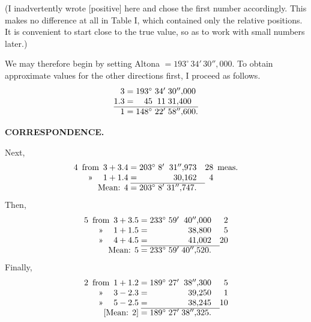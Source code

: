 (I inadvertently wrote [positive] here and chose the first number accordingly. This makes no difference at all in Table I, which contained only the relative positions. It is convenient to start close to the true value, so as to work with small numbers later.)

We may therefore begin by setting Altona \(=193^\circ\,34'\,30''{,}000\). To obtain approximate values for the other directions first, I proceed as follows.
\[
\begin{array}{@{}r@{\;=\;}r@{\;}r@{\;}l@{}}
 3&193^\circ&34'&30''{,}000\\
 1.3&45&11&31{,}400\\
 \hline
 1&148^\circ&22'&58''{,}600.
\end{array}
\]
\par\noindent\makebox[.86\linewidth][r]{36\textsuperscript{*}}\par

\par\clearpage
\noindent{}\hfill{\small\textbf{CORRESPONDENCE.}}\hfill\null\par\medskip

Next,
\[
\begin{array}{@{}r@{\enspace}c@{\enspace}r@{\;}c@{\;}r@{\;}r@{\;}r@{\quad}r@{\enspace}l@{}}
 4&\text{from}&3+3.4&=&203^\circ&8'&31''{,}973&28&\text{meas.}\\
 &\text{»}&1+1.4&=& &&30{,}162&4&\\
 \cline{4-7}
 \multicolumn{3}{r@{\;}}{\text{Mean: }4}&=&203^\circ&8'&31''{,}747.& &
\end{array}
\]
\indent Then,
\[
\begin{array}{@{}r@{\enspace}c@{\enspace}r@{\;}c@{\;}r@{\;}r@{\;}r@{\quad}r@{}}
 5&\text{from}&3+3.5&=&233^\circ&59'&40''{,}000&2\\
 &\text{»}&1+1.5&=& &&38{,}800&5\\
 &\text{»}&4+4.5&=& &&41{,}002&20\\
 \cline{4-7}
 \multicolumn{3}{r@{\;}}{\text{Mean: }5}&=&233^\circ&59'&40''{,}520.&
\end{array}
\]
\indent Finally,
\[
\begin{array}{@{}r@{\enspace}c@{\enspace}r@{\;}c@{\;}r@{\;}r@{\;}r@{\quad}r@{}}
 2&\text{from}&1+1.2&=&189^\circ&27'&38''{,}300&5\\
 &\text{»}&3-2.3&=& &&39{,}250&1\\
 &\text{»}&5-2.5&=& &&38{,}245&10\\
 \cline{4-7}
 \multicolumn{3}{r@{\;}}{\text{[Mean: }2]}&=&189^\circ&27'&38''{,}325.&
\end{array}
\]

